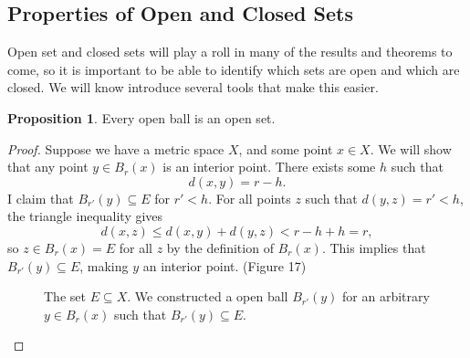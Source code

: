\documentclass{article}
\theoremstyle{definition}
\newtheorem{proposition}{Proposition}[section]
\begin{document}
	\subsection{Properties of Open and Closed Sets}
	Open set and closed sets will play a roll in many of the results and theorems to come, so it is important to be able to identify which sets are open and which are closed. We will know introduce several tools that make this easier.  
	\begin{proposition}
		Every open ball is an open set.
	\end{proposition}
	\begin{proof}
		Suppose we have a metric space $ X $, and some point $ x\in X $. We will show that any point $ y\in B_r(x) $ is an interior point. There exists some $ h $ such that $$d(x,y)=r-h .$$ I claim that $ B_{r'}(y)\subseteq E $ for $ r'<h $. For all points $ z $ such that $ d(y,z)=r'<h $, the triangle inequality gives $$d(x,z)\le d(x,y)+d(y,z)<r-h+h=r, $$ so $ z\in B_r(x)=E $ for all $ z $ by the definition of $ B_r(x) $. This implies that $ B_{r'}(y)\subseteq E $, making $ y $ an interior point. (Figure 17)
		\begin{figure}[h]
			\centering
			\caption{The set $ E\subseteq X $. We constructed a open ball $ B_{r'}(y) $ for an arbitrary $ y\in B_r(x) $ such that $ B_{r'}(y)\subseteq E $. }
		\end{figure}
	\end{proof}
	
\end{document}
